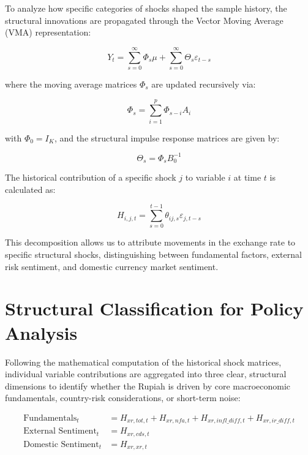 \documentclass[11pt,a4paper]{article}
\begin{document}
To analyze how specific categories of shocks shaped the sample history, the structural innovations are propagated through the Vector Moving Average (VMA) representation:

\begin{equation}
Y_t = \sum_{s=0}^{\infty} \Phi_s \mu + \sum_{s=0}^{\infty} \Theta_s \varepsilon_{t-s}
\label{eq:vma_representation}
\end{equation}

where the moving average matrices $\Phi_s$ are updated recursively via:

\begin{equation}
\Phi_s = \sum_{i=1}^{p} \Phi_{s-i} A_i
\label{eq:phi_recursion}
\end{equation}

with $\Phi_0 = I_K$, and the structural impulse response matrices are given by:

\begin{equation}
\Theta_s = \Phi_s B_0^{-1}
\label{eq:theta_definition}
\end{equation}

The historical contribution of a specific shock $j$ to variable $i$ at time $t$ is calculated as:

\begin{equation}
H_{i,j,t} = \sum_{s=0}^{t-1} \theta_{ij, s} \varepsilon_{j, t-s}
\label{eq:historical_contribution}
\end{equation}

This decomposition allows us to attribute movements in the exchange rate to specific structural shocks, distinguishing between fundamental factors, external risk sentiment, and domestic currency market sentiment.

\section{Structural Classification for Policy Analysis}

Following the mathematical computation of the historical shock matrices, individual variable contributions are aggregated into three clear, structural dimensions to identify whether the Rupiah is driven by core macroeconomic fundamentals, country-risk considerations, or short-term noise:

\begin{align}
\text{Fundamentals}_t &= H_{xr,tot,t} + H_{xr,nfa,t} + H_{xr,infl\_diff,t} + H_{xr,ir\_diff,t} \label{eq:fundamentals} \\
\text{External Sentiment}_t &= H_{xr,cds,t} \label{eq:external_sentiment} \\
\text{Domestic Sentiment}_t &= H_{xr,xr,t} \label{eq:domestic_sentiment}
\end{align}
\end{document}
